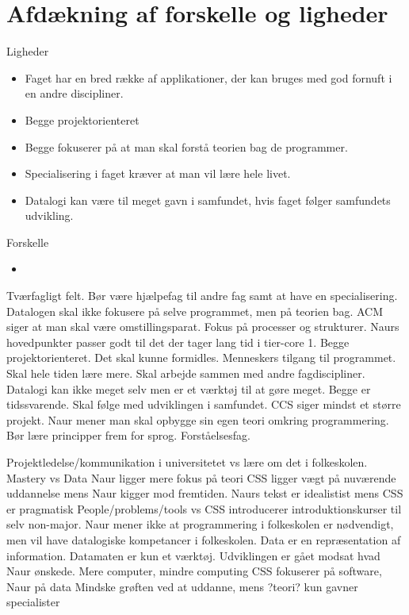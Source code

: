 \section{Afdækning af forskelle og ligheder}

Ligheder
\begin{itemize}
\item Faget har en bred række af applikationer, der kan bruges med god fornuft i en andre discipliner.
\item Begge projektorienteret
\item Begge fokuserer på at man skal forstå teorien bag de programmer.
\item Specialisering i faget kræver at man vil lære hele livet.
\item Datalogi kan være til meget gavn i samfundet, hvis faget følger samfundets udvikling.
\end{itemize}

Forskelle
\begin{itemize}
\item 
\end{itemize}

Tværfagligt felt. Bør være hjælpefag til andre fag samt at have en specialisering.
Datalogen skal ikke fokusere på selve programmet, men på teorien bag. ACM siger at man skal være omstillingsparat.
Fokus på processer og strukturer. Naurs hovedpunkter passer godt til det der tager lang tid i tier-core 1.
Begge projektorienteret.
Det skal kunne formidles.
Menneskers tilgang til programmet.
Skal hele tiden lære mere.
Skal arbejde sammen med andre fagdiscipliner.
Datalogi kan ikke meget selv men er et værktøj til at gøre meget.
Begge er tidssvarende.
Skal følge med udviklingen i samfundet.
CCS siger mindst et større projekt.
Naur mener man skal opbygge sin egen teori omkring programmering.
Bør lære principper frem for sprog. Forståelsesfag.


Projektledelse/kommunikation i universitetet vs lære om det i folkeskolen.
Mastery vs Data
Naur ligger mere fokus på teori
CSS ligger vægt på nuværende uddannelse mens Naur kigger mod fremtiden.
Naurs tekst er idealistist mens CSS er pragmatisk
People/problems/tools vs 
CSS introducerer introduktionskurser til selv non-major. Naur mener ikke at programmering i folkeskolen er nødvendigt, men vil have datalogiske kompetancer i folkeskolen.
Data er en repræsentation af information. Datamaten er kun et værktøj.
Udviklingen er gået modsat hvad Naur ønskede. Mere computer, mindre computing
CSS fokuserer på software, Naur på data
Mindske grøften ved at uddanne, mens ?teori? kun gavner specialister

